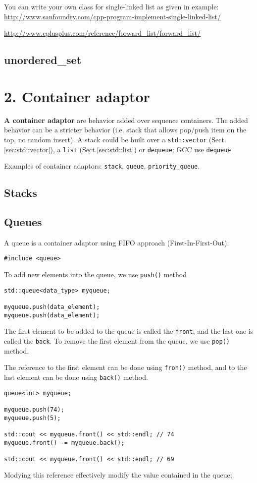 You can write your own class for single-linked list as given in example:
\url{http://www.sanfoundry.com/cpp-program-implement-single-linked-list/}

\url{http://www.cplusplus.com/reference/forward_list/forward_list/}

\subsection{unordered\_set}
\label{sec:std::unordered_set}



\section{2. Container adaptor}
\label{sec:container-adaptor}

{\bf A container adaptor} are behavior added over sequence containers. The added
behavior can be a stricter behavior (i.e. stack that allows pop/push item on
the top, no random insert). A stack could be built over a \verb!std::vector!
(Sect.\ref{sec:std::vector}), a \verb!list! (Sect.\ref{sec:std::list}) or
\verb!dequeue!; GCC use \verb!dequeue!.

Examples of container adaptors: \verb!stack!, \verb!queue!,
\verb!priority_queue!.


\subsection{Stacks}

\subsection{Queues}

A queue is a container adaptor using FIFO approach (First-In-First-Out). 
\begin{lstlisting}
#include <queue>
\end{lstlisting}

To add new elements into the queue, we use \verb!push()! method
\begin{verbatim}
std::queue<data_type> myqueue;

myqueue.push(data_element);
myqueue.push(data_element);
\end{verbatim}
The first element to be added to the queue is called the \verb!front!, and the
last one is called the \verb!back!. To remove the first element from the queue,
we use \verb!pop()! method.

The reference to the first element can be done using \verb!fron()! method, and
to the last element can be done using \verb!back()! method.
\begin{lstlisting}
queue<int> myqueue;

myqueue.push(74);
myqueue.push(5);

std::cout << myqueue.front() << std::endl; // 74
myqueue.front() -= myqueue.back();

std::cout << myqueue.front() << std::endl; // 69
\end{lstlisting}
Modying this reference effectively modify the value contained in the queue;

